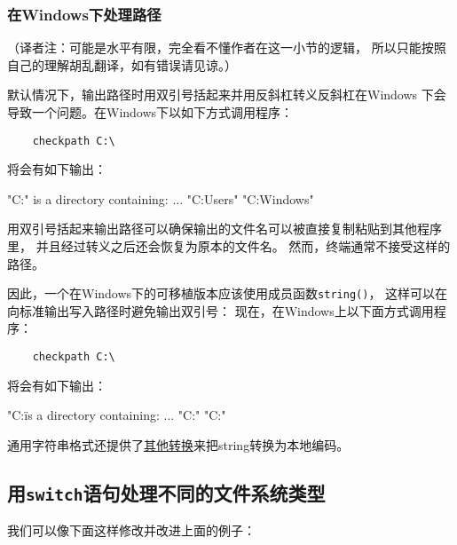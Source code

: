 \subsubsection{在Windows下处理路径}\label{ch20.1.1.1}
（译者注：可能是水平有限，完全看不懂作者在这一小节的逻辑，
所以只能按照自己的理解胡乱翻译，如有错误请见谅。）

默认情况下，输出路径时用双引号括起来并用反斜杠转义反斜杠在Windows
下会导致一个问题。在Windows下以如下方式调用程序：
\begin{lstlisting}
    checkpath C:\
\end{lstlisting}
将会有如下输出：
\begin{blacklisting}
    "C:" is a directory containing:
      ...
      "C:Users"
      "C:Windows"
\end{blacklisting}
用双引号括起来输出路径可以确保输出的文件名可以被直接复制粘贴到其他程序里，
并且经过转义之后还会恢复为原本的文件名。
然而，终端通常不接受这样的路径。

因此，一个在Windows下的可移植版本应该使用成员函数\texttt{string()}，
这样可以在向标准输出写入路径时避免输出双引号：
现在，在Windows上以下面方式调用程序：
\begin{lstlisting}
    checkpath C:\
\end{lstlisting}
将会有如下输出：
\begin{blacklisting}
    "C:\" is a directory containing:
      ...
      "C:\Users"
      "C:\Windows"
\end{blacklisting}
通用字符串格式还提供了\hyperref[ch20.3.4]{其他转换}来把string转换为本地编码。

\subsection{用\texttt{switch}语句处理不同的文件系统类型}
我们可以像下面这样修改并改进上面的例子：

